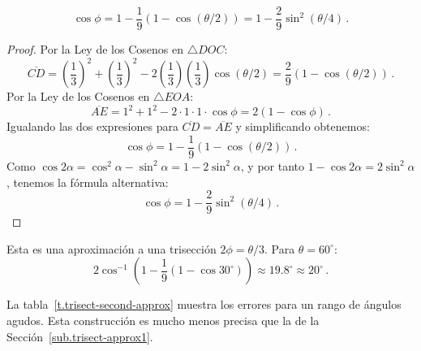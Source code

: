 \begin{theorem}
\[
\cos\phi=1 - \frac{1}{9}(1-\cos(\theta/2))=1 - \frac{2}{9}\sin^2(\theta/4)\,.
\]
\end{theorem}
\begin{proof} Por la Ley de los Cosenos en $\triangle DOC$:
\[
\overline{CD}= \left(\frac{1}{3}\right)^2+\left(\frac{1}{3}\right)^2-2\left(\frac{1}{3}\right)\left(\frac{1}{3}\right)\cos (\theta/2)=\frac{2}{9}(1-\cos(\theta/2))\,.
\]
Por la Ley de los Cosenos en $\triangle EOA$:
\[
\overline{AE} = 1^2+1^2-2\cdot 1\cdot 1\cdot \cos \phi=2(1-\cos \phi)\,.
\]
Igualando las dos expresiones para $\overline{CD}=\overline{AE}$ y simplificando obtenemos:
\[
\cos \phi = 1 - \frac{1}{9}(1-\cos(\theta/2))\,.
\]
Como $\cos 2\alpha= \cos^2 \alpha-\sin^2\alpha=1-2\sin^2\alpha$, y por tanto $1-\cos 2\alpha=2\sin^2\alpha$, tenemos la fórmula alternativa:
\[
\cos \phi = 1 - \frac{2}{9}\sin^2(\theta/4)\,.
\]
\end{proof}

Esta es una aproximación a una trisección $2\phi=\theta/3$. Para $\theta=60^\circ$:
\[
2\cos^{-1}\left(1 - \frac{1}{9}(1-\cos 30^\circ)\right)\approx 19.8^\circ\approx 20^\circ\,.
\]

La tabla~\ref{t.trisect-second-approx} muestra los errores para un rango de ángulos agudos. Esta construcción es mucho menos precisa que la de la Sección~\ref{sub.trisect-approx1}.

